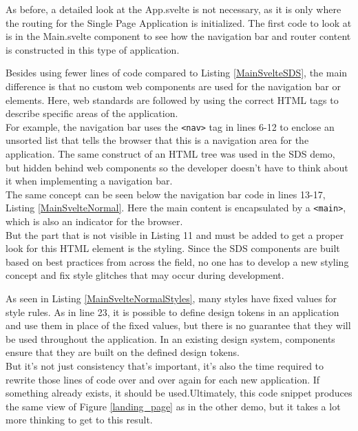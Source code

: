 As before, a detailed look at the App.svelte is not necessary, as it is only where the routing for the Single Page Application is initialized. The first code to look at is in the Main.svelte component to see how the navigation bar and router content is constructed in this type of application. 

Besides using fewer lines of code compared to Listing \ref{MainSvelteSDS}, the main difference is that no custom web components are used for the navigation bar or elements. Here, web standards are followed by using the correct HTML tags to describe specific areas of the application. \\
For example, the navigation bar uses the \texttt{<nav>} tag in lines 6-12 to enclose an unsorted list that tells the browser that this is a navigation area for the application. The same construct of an HTML tree was used in the \ac{SDS} demo, but hidden behind web components so the developer doesn't have to think about it when implementing a navigation bar. \\
The same concept can be seen below the navigation bar code in lines 13-17, Listing \ref{MainSvelteNormal}. Here the main content is encapsulated by a \texttt{<main>}, which is also an indicator for the browser. \\
But the part that is not visible in Listing 11 and must be added to get a proper look for this HTML element is the styling. Since the SDS components are built based on best practices from across the field, no one has to develop a new styling concept and fix style glitches that may occur during development. 

As seen in Listing \ref{MainSvelteNormalStyles}, many styles have fixed values for style rules. As in line 23, it is possible to define design tokens in an application and use them in place of the fixed values, but there is no guarantee that they will be used throughout the application. In an existing design system, components ensure that they are built on the defined design tokens. \\
But it's not just consistency that's important, it's also the time required to rewrite those lines of code over and over again for each new application. If something already exists, it should be used.Ultimately, this code snippet produces the same view of Figure \ref{landing_page} as in the other demo, but it takes a lot more thinking to get to this result.  \\

